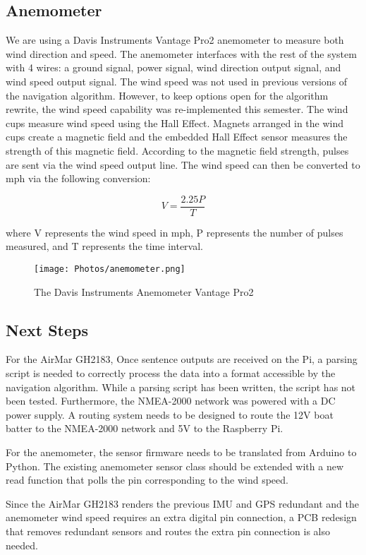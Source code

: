 \documentclass{article}
\begin{document}
\subsection{Anemometer}
We are using a Davis Instruments Vantage Pro2 anemometer to measure both wind direction and speed. The anemometer interfaces with the rest of the system with
4 wires: a ground signal, power signal, wind direction output signal, and wind speed output signal. The wind speed was not used in previous versions of the navigation algorithm. However, to keep options open for the algorithm rewrite, the wind speed capability was re-implemented this semester. 
The wind cups measure wind speed using the Hall Effect. Magnets arranged in the wind cups create a magnetic field and the embedded Hall Effect sensor measures the strength of this magnetic field. According to the magnetic field strength, pulses are sent via the wind speed output line. The wind speed can then be converted to mph via the following conversion:

\begin{equation}
V = \frac{2.25P}{T}
\end{equation}

where V represents the wind speed in mph, P represents the number of pulses measured, and T represents the time interval.
\begin{figure}[h]
    \centering
    \texttt{[image: Photos/anemometer.png]}
    \caption{The Davis Instruments Anemometer Vantage Pro2}
    \label{fig: Photos/anemometer.png}
\end{figure}

\subsection{Next Steps}
For the AirMar GH2183, Once sentence outputs are received on the Pi, a parsing script is needed to correctly process the data into a format accessible by the navigation algorithm. While a parsing script has been written, the script has not been tested. Furthermore, the NMEA-2000 network was powered with a DC power supply. A routing system needs to be designed to route the 12V boat batter to the NMEA-2000 network and 5V to the Raspberry Pi. 

For the anemometer, the sensor firmware needs to be translated from Arduino to Python. The existing anemometer sensor class should be extended with a new read function that polls the pin corresponding to the wind speed. 

Since the AirMar GH2183 renders the previous IMU and GPS redundant and the anemometer wind speed requires an extra digital pin connection, a PCB redesign that removes redundant sensors and routes the extra pin connection is also needed. 
\end{document}
